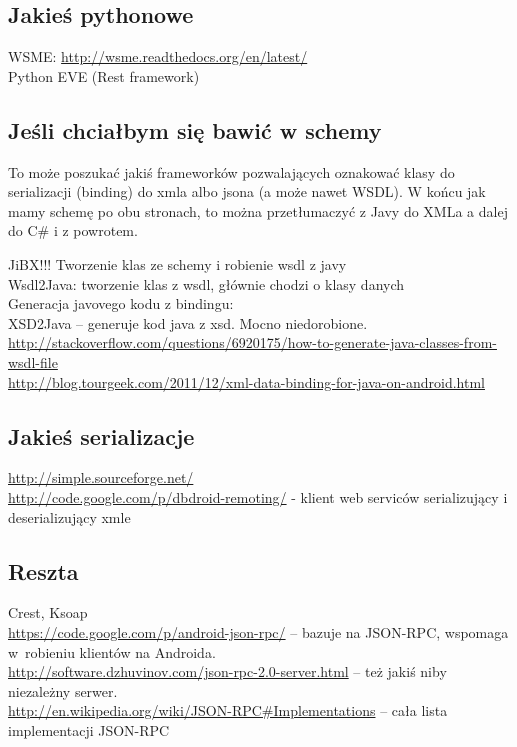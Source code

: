 \subsection{Jakieś pythonowe}
WSME: \url{http://wsme.readthedocs.org/en/latest/}\\
Python EVE (Rest framework)\\

\subsection{Jeśli chciałbym się bawić w schemy}
To może poszukać jakiś frameworków pozwalających oznakować klasy do serializacji (binding) do xmla albo jsona (a może nawet WSDL).
W końcu jak mamy schemę po obu stronach, to można przetłumaczyć z Javy do XMLa a dalej do C\# i z powrotem.

JiBX!!! Tworzenie klas ze schemy i robienie wsdl z javy\\
Wsdl2Java: tworzenie klas z wsdl, głównie chodzi o klasy danych\\

Generacja javovego kodu z bindingu:\\
XSD2Java – generuje kod java z xsd. Mocno niedorobione.\\

\url{http://stackoverflow.com/questions/6920175/how-to-generate-java-classes-from-wsdl-file}\\
\url{http://blog.tourgeek.com/2011/12/xml-data-binding-for-java-on-android.html}\\

\subsection{Jakieś serializacje}
\url{http://simple.sourceforge.net/}\\
\url{http://code.google.com/p/dbdroid-remoting/} - klient web serviców serializujący i deserializujący xmle\\

\subsection{Reszta}
Crest, Ksoap \\
\url{https://code.google.com/p/android-json-rpc/} -- bazuje na JSON-RPC, wspomaga w~robieniu klientów na Androida.\\
\url{http://software.dzhuvinov.com/json-rpc-2.0-server.html} -- też jakiś niby niezależny serwer. \\ 
\url{http://en.wikipedia.org/wiki/JSON-RPC#Implementations} -- cała lista implementacji JSON-RPC



